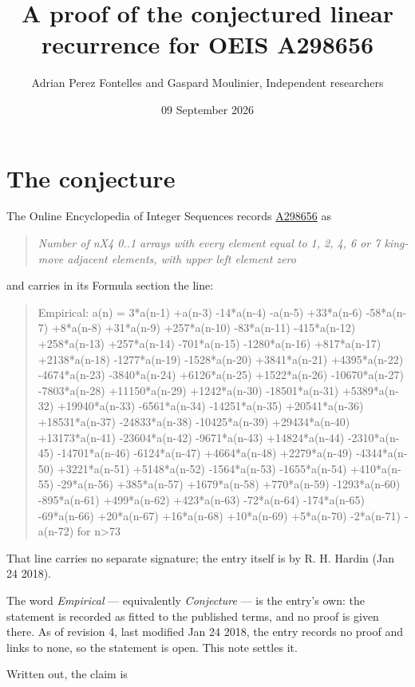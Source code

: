 \documentclass[11pt]{article}
\title{A proof of the conjectured linear recurrence for OEIS A298656}
\author{Adrian Perez Fontelles and Gaspard Moulinier, Independent researchers}
\date{09 September 2026}
\theoremstyle{definition}
\begin{document}
\maketitle
\section{The conjecture}

The Online Encyclopedia of Integer Sequences records \href{https://oeis.org/A298656}{A298656} as

\begin{quote}\itshape Number of nX4 0..1 arrays with every element equal to 1, 2, 4, 6 or 7 king-move adjacent elements, with upper left element zero\end{quote}

and carries in its Formula section the line:

\begin{quote}\ttfamily Empirical: a(n) = 3*a(n-1) +a(n-3) -14*a(n-4) -a(n-5) +33*a(n-6) -58*a(n-7) +8*a(n-8) +31*a(n-9) +257*a(n-10) -83*a(n-11) -415*a(n-12) +258*a(n-13) +257*a(n-14) -701*a(n-15) -1280*a(n-16) +817*a(n-17) +2138*a(n-18) -1277*a(n-19) -1528*a(n-20) +3841*a(n-21) +4395*a(n-22) -4674*a(n-23) -3840*a(n-24) +6126*a(n-25) +1522*a(n-26) -10670*a(n-27) -7803*a(n-28) +11150*a(n-29) +1242*a(n-30) -18501*a(n-31) +5389*a(n-32) +19940*a(n-33) -6561*a(n-34) -14251*a(n-35) +20541*a(n-36) +18531*a(n-37) -24833*a(n-38) -10425*a(n-39) +29434*a(n-40) +13173*a(n-41) -23604*a(n-42) -9671*a(n-43) +14824*a(n-44) -2310*a(n-45) -14701*a(n-46) -6124*a(n-47) +4664*a(n-48) +2279*a(n-49) -4344*a(n-50) +3221*a(n-51) +5148*a(n-52) -1564*a(n-53) -1655*a(n-54) +410*a(n-55) -29*a(n-56) +385*a(n-57) +1679*a(n-58) +770*a(n-59) -1293*a(n-60) -895*a(n-61) +499*a(n-62) +423*a(n-63) -72*a(n-64) -174*a(n-65) -69*a(n-66) +20*a(n-67) +16*a(n-68) +10*a(n-69) +5*a(n-70) -2*a(n-71) -a(n-72) for n>73\end{quote}

That line carries no separate signature; the entry itself is by R. H. Hardin (Jan 24 2018).

The word {\itshape Empirical} --- equivalently {\itshape Conjecture} --- is the entry's own: the statement is recorded as fitted to the published terms, and no proof is given there. As of revision 4, last modified Jan 24 2018, the entry records no proof and links to none, so the statement is open. This note settles it.

Written out, the claim is
\end{document}

